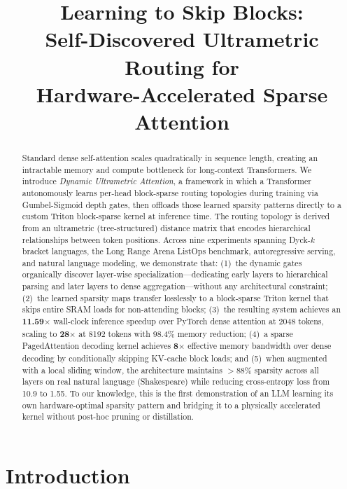 \documentclass[11pt,a4paper]{article}
\title{\textbf{Learning to Skip Blocks:}\\
Self-Discovered Ultrametric Routing for\\
Hardware-Accelerated Sparse Attention}
\author{
}
\date{}
\begin{document}
\maketitle

\begin{abstract}
Standard dense self-attention scales quadratically in sequence length, creating an intractable memory and compute bottleneck for long-context Transformers. We introduce \emph{Dynamic Ultrametric Attention}, a framework in which a Transformer autonomously learns per-head block-sparse routing topologies during training via Gumbel-Sigmoid depth gates, then offloads those learned sparsity patterns directly to a custom Triton block-sparse kernel at inference time. The routing topology is derived from an ultrametric (tree-structured) distance matrix that encodes hierarchical relationships between token positions. Across nine experiments spanning Dyck-$k$ bracket languages, the Long Range Arena ListOps benchmark, autoregressive serving, and natural language modeling, we demonstrate that: (1)~the dynamic gates organically discover layer-wise specialization---dedicating early layers to hierarchical parsing and later layers to dense aggregation---without any architectural constraint; (2)~the learned sparsity maps transfer losslessly to a block-sparse Triton kernel that skips entire SRAM loads for non-attending blocks; (3)~the resulting system achieves an \textbf{11.59$\times$} wall-clock inference speedup over PyTorch dense attention at 2048 tokens, scaling to \textbf{28$\times$} at 8192 tokens with 98.4\% memory reduction; (4)~a sparse PagedAttention decoding kernel achieves \textbf{8$\times$} effective memory bandwidth over dense decoding by conditionally skipping KV-cache block loads; and (5)~when augmented with a local sliding window, the architecture maintains $>$88\% sparsity across all layers on real natural language (Shakespeare) while reducing cross-entropy loss from 10.9 to 1.55. To our knowledge, this is the first demonstration of an LLM learning its own hardware-optimal sparsity pattern and bridging it to a physically accelerated kernel without post-hoc pruning or distillation.
\end{abstract}

\section{Introduction}
\end{document}
